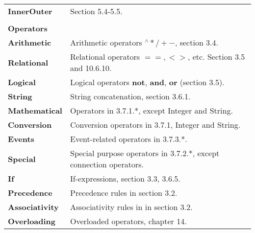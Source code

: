 \documentclass{article}
\begin{document}
\begin{tabular}{l l}
    \indent\textbf{InnerOuter}       & Section 5.4-5.5. \\
  \\
  \textbf{Operators} \\
    \indent\textbf{Arithmetic}       & Arithmetic operators $^\wedge\ast/+-$, section 3.4. \\
    \indent\textbf{Relational}       & Relational operators $==, <>$, etc. Section 3.5 and 10.6.10. \\
    \indent\textbf{Logical}          & Logical operators \textbf{not}, \textbf{and}, \textbf{or} (section 3.5). \\
    \indent\textbf{String}           & String concatenation, section 3.6.1. \\
    \indent\textbf{Mathematical}     & Operators in 3.7.1.*, except Integer and String. \\
    \indent\textbf{Conversion}       & Conversion operators in 3.7.1, Integer and String.  \\
    \indent\textbf{Events}           & Event-related operators in 3.7.3.*. \\
    \indent\textbf{Special}          & Special purpose operators in 3.7.2.*, except connection operators. \\
    \indent\textbf{If}               & If-expressions, section 3.3, 3.6.5. \\
    \indent\textbf{Precedence}       & Precedence rules in section 3.2. \\
    \indent\textbf{Associativity}    & Associativity rules in in section 3.2. \\
    \indent\textbf{Overloading}      & Overloaded operators, chapter 14. \\

\end{tabular}
\end{document}
